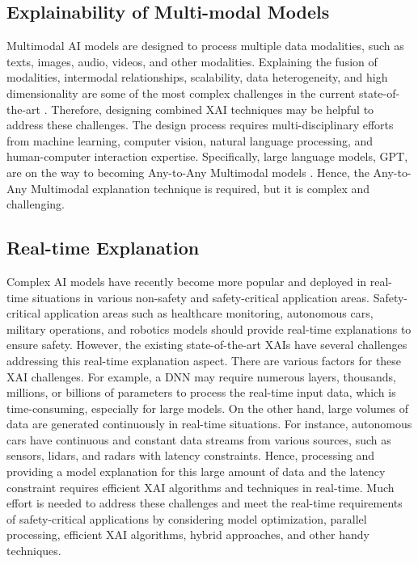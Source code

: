 \documentclass[final,5p,times,twocolumn]{elsarticle}
\begin{document}
\subsection{Explainability of Multi-modal Models}
Multimodal AI models are designed to process multiple data modalities, such as texts, images, audio, videos, and other modalities. Explaining the fusion of modalities, intermodal relationships, scalability, data heterogeneity, and high dimensionality are some of the most complex challenges in the current state-of-the-art \cite{chefer2021generic}. Therefore, designing combined XAI techniques may be helpful to address these challenges. The design process requires multi-disciplinary efforts from machine learning, computer vision, natural language processing, and human-computer interaction expertise. Specifically, large language models, GPT, are on the way to becoming Any-to-Any Multimodal models \cite{wu2023next}. Hence, the Any-to-Any Multimodal explanation technique is required, but it is complex and challenging.



\subsection{Real-time Explanation}
Complex AI models have recently become more popular and deployed in real-time situations in various non-safety and safety-critical application areas. Safety-critical application areas such as healthcare monitoring, autonomous cars, military operations, and robotics models should provide real-time explanations to ensure safety. However, the existing state-of-the-art XAIs have several challenges addressing this real-time explanation aspect. There are various factors for these XAI challenges. For example, a DNN may require numerous layers, thousands, millions, or billions of parameters to process the real-time input data, which is time-consuming, especially for large models. On the other hand, large volumes of data are generated continuously in real-time situations. For instance, autonomous cars have continuous and constant data streams from various sources, such as sensors, lidars, and radars with latency constraints. Hence, processing and providing a model explanation for this large amount of data and the latency constraint requires efficient XAI algorithms and techniques in real-time. Much effort is needed to address these challenges and meet the real-time requirements of safety-critical applications by considering model optimization, parallel processing, efficient XAI algorithms, hybrid approaches, and other handy techniques.
\end{document}

